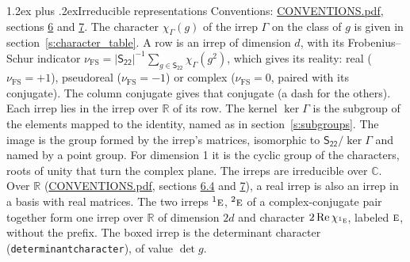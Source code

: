 \documentclass[10pt,a4paper]{article}
\makeatletter
\renewcommand\section{\@startsection{section}{1}{\z@}{-3ex plus -1ex minus -.2ex}%
  {1.2ex plus .2ex}{\normalfont\large\sffamily\bfseries\color{parttitle}}}
\numberwithin{equation}{section}
\newcommand{\grp}[1]{\mathsf{#1}}
\newcommand{\irr}[1]{\text{\normalfont\scshape #1}}
\newcommand{\conjpair}[1]{{}^{#1}}
\newcommand{\irchar}[1]{\chi_{#1}}
\newcommand{\fsind}{\nu_{\mathrm{FS}}}
\makeatother
\begin{document}
\section{Irreducible representations}\label{s:irreps}
Conventions: \href{../../CONVENTIONS.pdf}{CONVENTIONS.pdf}, sections \href{../../CONVENTIONS.pdf\#conv.6}{6} and \href{../../CONVENTIONS.pdf\#conv.7}{7}.
\leavevmode\label{n:function.character}\label{n:irrep.Gamma}The character $\irchar{\Gamma}(g)$ of the irrep $\Gamma$ on the class of $g$ is given in section~\ref{s:character_table}.
\leavevmode\label{n:index.dimension}\label{n:index.frobenius}\label{n:head.irrep}\label{n:head.reality}A row is an irrep of dimension $d$, with its Frobenius--Schur indicator $\fsind = |\grp{S_{22}}|^{-1}\allowbreak\sum_{g\in\grp{S_{22}}}\irchar{\Gamma}(g^2)$, which gives its reality: real ($\fsind = +1$), pseudoreal ($\fsind = -1$) or complex ($\fsind = 0$, paired with its conjugate). \label{n:head.conjugate}The column conjugate gives that conjugate (a dash for the others). \label{n:head.over.real}Each irrep lies in the irrep over $\mathbb{R}$ of its row. \label{n:head.kernel}The kernel $\ker\Gamma$ is the subgroup of the elements mapped to the identity, named as in section~\ref{s:subgroups}. \label{n:head.image}The image is the group formed by the irrep's matrices, isomorphic to $\grp{S_{22}}/\ker\Gamma$ and named by a point group. For dimension 1 it is the cyclic group of the characters, roots of unity that turn the complex plane. The irreps are irreducible over $\mathbb{C}$. Over $\mathbb{R}$ (\href{../../CONVENTIONS.pdf}{CONVENTIONS.pdf}, sections \href{../../CONVENTIONS.pdf\#conv.6.4}{6.4} and \href{../../CONVENTIONS.pdf\#conv.7}{7}), a real irrep is also an irrep in a basis with real matrices. The two irreps $\conjpair{1}\irr{e}$, $\conjpair{2}\irr{e}$ of a complex-conjugate pair together form one irrep over $\mathbb{R}$ of dimension $2d$ and character $2\operatorname{Re}\irchar{\conjpair{1}\irr{e}}$, labeled $\irr{e}$, without the prefix. \label{n:mark.determinant}The boxed irrep is the determinant character (\texttt{determinantcharacter}), of value $\det g$.
\setlength{\emergencystretch}{2em}\par\setlength{\emergencystretch}{0pt}
\end{document}
